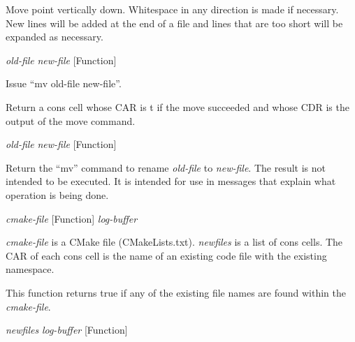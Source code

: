 \begin{doc-string}
Move point vertically down.  Whitespace in any direction is made if
necessary.  New lines will be added at the end of a file and lines that are
too short will be expanded as necessary.
\end{doc-string}

\vspace{1em}
\noindent
{}
\usebox{\funcname}\emph{old-file} \emph{new-file}
 \hfill [Function]

\begin{doc-string}
Issue ``mv old-file new-file''.

Return a cons cell whose CAR is t if the move succeeded and whose CDR is the
output of the move command.
\end{doc-string}

\vspace{1em}
\noindent
{}
\usebox{\funcname}\emph{old-file} \emph{new-file}
 \hfill [Function]

\begin{doc-string}
Return the ``mv'' command to rename \emph{old-file} to \emph{new-file}.  The result is
not intended to be executed.  It is intended for use in messages that explain
what operation is being done.
\end{doc-string}

\vspace{1em}
\noindent
{}
\usebox{\funcname}\emph{cmake-file}
 \hfill [Function]
\hspace*{\wd\funcname}\emph{log-buffer}

\begin{doc-string}
\emph{cmake-file} is a CMake file (CMakeLists.txt).  \emph{newfiles} is a list of cons
cells.  The CAR of each cons cell is the name of an existing code file with the
existing namespace.

This function returns true if any of the existing file names are found within
the \emph{cmake-file}.
\end{doc-string}

\vspace{1em}
\noindent
{}
\usebox{\funcname}\emph{newfiles} \emph{log-buffer}
 \hfill [Function]

